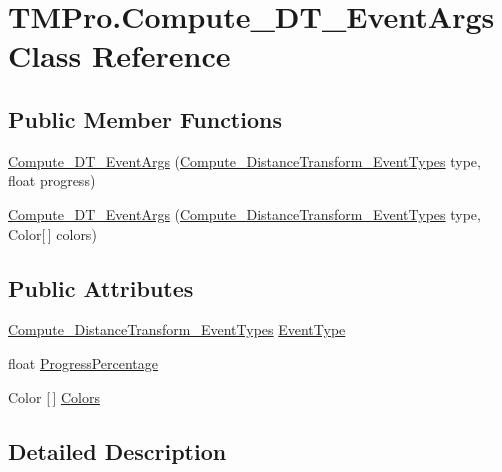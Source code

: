 \hypertarget{class_t_m_pro_1_1_compute___d_t___event_args}{}\section{T\+M\+Pro.\+Compute\+\_\+\+D\+T\+\_\+\+Event\+Args Class Reference}
\label{class_t_m_pro_1_1_compute___d_t___event_args}
\subsection*{Public Member Functions}
\begin{DoxyCompactItemize}
\item 
\mbox{\hyperlink{class_t_m_pro_1_1_compute___d_t___event_args_ad8c2efb977ea8e6e15815ced2257af5d}{Compute\+\_\+\+D\+T\+\_\+\+Event\+Args}} (\mbox{\hyperlink{namespace_t_m_pro_af6aadc6d9f8a76a743cd456760e57316}{Compute\+\_\+\+Distance\+Transform\+\_\+\+Event\+Types}} type, float progress)
\item 
\mbox{\hyperlink{class_t_m_pro_1_1_compute___d_t___event_args_aeb19de7c5ec823f91a81ebf58358ee76}{Compute\+\_\+\+D\+T\+\_\+\+Event\+Args}} (\mbox{\hyperlink{namespace_t_m_pro_af6aadc6d9f8a76a743cd456760e57316}{Compute\+\_\+\+Distance\+Transform\+\_\+\+Event\+Types}} type, Color\mbox{[}$\,$\mbox{]} colors)
\end{DoxyCompactItemize}
\subsection*{Public Attributes}
\begin{DoxyCompactItemize}
\item 
\mbox{\hyperlink{namespace_t_m_pro_af6aadc6d9f8a76a743cd456760e57316}{Compute\+\_\+\+Distance\+Transform\+\_\+\+Event\+Types}} \mbox{\hyperlink{class_t_m_pro_1_1_compute___d_t___event_args_aff068cc0c90d7f96e3b8a2fc0c73c67e}{Event\+Type}}
\item 
float \mbox{\hyperlink{class_t_m_pro_1_1_compute___d_t___event_args_a988c5b1a78e1d385ca62d369e49ce09e}{Progress\+Percentage}}
\item 
Color \mbox{[}$\,$\mbox{]} \mbox{\hyperlink{class_t_m_pro_1_1_compute___d_t___event_args_a3c633528f0d473cdb7564ae9e0babf2a}{Colors}}
\end{DoxyCompactItemize}


\subsection{Detailed Description}


